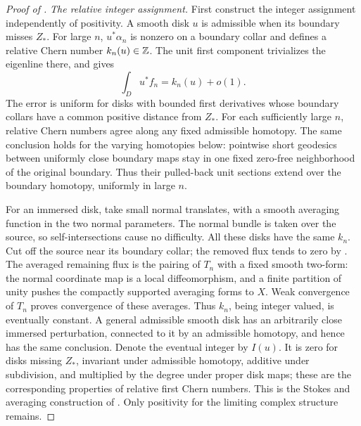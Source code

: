 \begin{proof}[Proof of ]
\smallskip
\noindent\emph{The relative integer assignment.}
First construct the integer assignment independently of positivity.
A smooth disk \(u\) is admissible when its boundary misses \(Z_*\).
For large \(n\), \(u^*\alpha_n\) is nonzero on a boundary
collar and defines a relative Chern number \(k_n(u)\in\mathbb Z\).
The unit first component trivializes the eigenline there, and
 gives
\begin{equation}
 \label{eq:families-relative-degree}
 \int_Du^*f_n=k_n(u)+o(1).
\end{equation}
The error is uniform for disks with bounded first derivatives whose
boundary collars have a common positive distance from \(Z_*\).
For each sufficiently large \(n\), relative Chern numbers agree
along any fixed admissible homotopy.  The same conclusion holds for
the varying homotopies below: pointwise short geodesics between
uniformly close boundary maps stay in one fixed zero-free
neighborhood of the original boundary.  Thus their pulled-back
unit sections extend over the boundary homotopy, uniformly in
large \(n\).

For an immersed disk, take small normal translates, with a smooth
averaging function in the two normal parameters.  The normal bundle
is taken over the source, so self-intersections cause no difficulty.
All these disks have the same \(k_n\).  Cut off the source near its
boundary collar; the removed flux tends to zero by
.  The averaged remaining flux is
the pairing of \(T_n\) with a fixed smooth two-form: the normal
coordinate map is a local diffeomorphism, and a finite partition of
unity pushes the compactly supported averaging forms to \(X\).
Weak convergence of \(T_n\) proves convergence of these averages.
Thus \(k_n\), being integer valued, is eventually constant.  A
general admissible smooth disk has an arbitrarily close immersed
perturbation, connected to it by an admissible homotopy, and hence
has the same conclusion.  Denote the eventual integer by \(I(u)\).
It is zero for disks missing \(Z_*\), invariant under admissible
homotopy, additive under subdivision, and multiplied by the degree
under proper disk maps; these are the corresponding properties of
relative first Chern numbers.  This is the Stokes and averaging
construction of \cite[Proposition~5.6 and Lemma~6.2]{Taubes1996}.
Only positivity for the limiting complex structure remains.


\end{proof}
